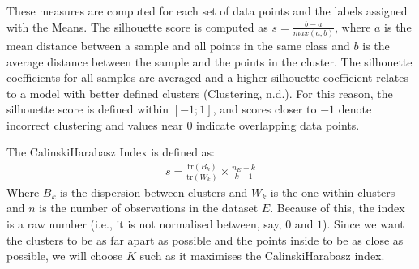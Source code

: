 \documentclass[letterpaper,10pt,english]{jupyterBook}
\begin{document}
\sphinxAtStartPar
These measures are computed for each set of data points and the labels assigned with the \sphinxhyphen{}Means. The silhouette score is computed as \(s = \frac{b - a}{max(a, b)}\), where \(a\) is the mean distance between a sample and all points in the same class and \(b\) is the average distance between the sample and the points in the  cluster. The silhouette coefficients for all samples are averaged and a higher silhouette coefficient relates to a model with better defined clusters (Clustering, n.d.). For this reason, the silhouette score is defined within \([-1;1]\), and scores closer to \(-1\) denote incorrect clustering and values near \(0\) indicate overlapping data points.

\sphinxAtStartPar
The Calinski\sphinxhyphen{}Harabasz Index is defined as:
\begin{equation*}
\begin{split}
s = \frac{\mathrm{tr}(B_k)}{\mathrm{tr}(W_k)} \times \frac{n_E - k}{k - 1}
\end{split}
\end{equation*}
\sphinxAtStartPar
Where \(B_k\) is the dispersion between clusters and \(W_k\) is the one within clusters and \(n\) is the number of observations in the dataset \(E\). Because of this, the index is a raw number (i.e., it is not normalised between, say, \(0\) and \(1\)). Since we want the clusters to be as far apart as possible and the points inside to be as close as possible, we will choose \(K\) such as it maximises the Calinski\sphinxhyphen{}Harabasz index.
\end{document}
